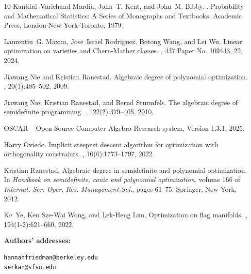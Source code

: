 \documentclass[12pt]{extarticle}
\theoremstyle{definition}
\numberwithin{theorem}{section}
\begin{document}
\begin{thebibliography}{10}
Kantilal~Varichand Mardia, John~T. Kent, and John~M. Bibby.
.
\newblock Probability and Mathematical Statistics: A Series of Monographs and Textbooks. Academic Press, London-New York-Toronto, 1979.

Laurentiu~G. Maxim, Jose~Israel Rodriguez, Botong Wang, and Lei Wu.
\newblock Linear optimization on varieties and {C}hern-{M}ather classes.
, 437:Paper No. 109443, 22, 2024.

Jiawang Nie and Kristian Ranestad.
\newblock Algebraic degree of polynomial optimization.
, 20(1):485--502, 2009.

Jiawang Nie, Kristian Ranestad, and Bernd Sturmfels.
\newblock The algebraic degree of semidefinite programming.
, 122(2):379--405, 2010.

{OSCAR -- Open Source Computer Algebra Research system, Version 1.3.1}, 2025.

Harry Oviedo.
\newblock Implicit steepest descent algorithm for optimization with orthogonality constraints.
, 16(6):1773--1797, 2022.

Kristian Ranestad.
\newblock Algebraic degree in semidefinite and polynomial optimization.
\newblock In {\em Handbook on semidefinite, conic and polynomial optimization}, volume 166 of {\em Internat. Ser. Oper. Res. Management Sci.}, pages 61--75. Springer, New York, 2012.

Ke~Ye, Ken Sze-Wai Wong, and Lek-Heng Lim.
\newblock Optimization on flag manifolds.
, 194(1-2):621--660, 2022.

\end{thebibliography}

\bigskip

\noindent
\footnotesize \textbf{Authors' addresses:}

\medskip 
{} \hfill \texttt{hannahfriedman@berkeley.edu}
\\
 \hfill \texttt{serkan@sfsu.edu}
\end{document}
